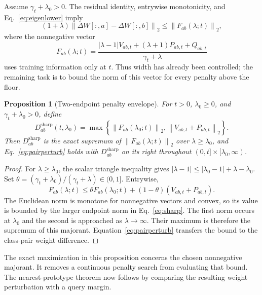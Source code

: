 \documentclass[preprint,12pt]{elsarticle}
\newtheorem{proposition}{Proposition}
\newcommand{\norm}[1]{\left\lVert#1\right\rVert}
\newcommand{\sharpb}{\mathrm{sharp}}
\begin{document}
Assume $\gamma_t+\lambda_0>0$. The residual identity, entrywise monotonicity, and Eq.~\eqref{eq:eigenlower} imply
\begin{equation}
 (1+\lambda)\norm{\Delta W[:,a]-\Delta W[:,b]}_2
 \leq\norm{F_{ab}(\lambda;t)}_2,
 \label{eq:pairperturb}
\end{equation}
where the nonnegative vector
\begin{equation}
 F_{ab}(\lambda;t)=
 \frac{|\lambda-1|V_{ab,t}+(\lambda+1)P_{ab,t}+Q_{ab,t}}
 {\gamma_t+\lambda}
 \label{eq:majorant}
\end{equation}
uses training information only at $t$. Thus width has already been controlled; the remaining task is to bound the norm of this vector for every penalty above the floor.

\begin{proposition}[Two-endpoint penalty envelope]
For $t>0$, $\lambda_0\geq0$, and $\gamma_t+\lambda_0>0$, define
\begin{equation}
 D^{\sharpb}_{ab}(t,\lambda_0)=
 \max\left\{\norm{F_{ab}(\lambda_0;t)}_2,
                  \norm{V_{ab,t}+P_{ab,t}}_2\right\}.
 \label{eq:sharp}
\end{equation}
Then $D^{\sharpb}_{ab}$ is the exact supremum of $\norm{F_{ab}(\lambda;t)}_2$ over $\lambda\geq\lambda_0$, and Eq.~\eqref{eq:pairperturb} holds with $D^{\sharpb}_{ab}$ on its right throughout $(0,t]\times[\lambda_0,\infty)$.
\end{proposition}
\begin{proof}
For $\lambda\geq\lambda_0$, the scalar triangle inequality gives
$|\lambda-1|\leq|\lambda_0-1|+\lambda-\lambda_0$. Set
$\theta=(\gamma_t+\lambda_0)/(\gamma_t+\lambda)\in(0,1]$. Entrywise,
\[
 F_{ab}(\lambda;t)
 \leq\theta F_{ab}(\lambda_0;t)
       +(1-\theta)(V_{ab,t}+P_{ab,t}).
\]
The Euclidean norm is monotone for nonnegative vectors and convex, so its value is bounded by the larger endpoint norm in Eq.~\eqref{eq:sharp}. The first norm occurs at $\lambda_0$ and the second is approached as $\lambda\to\infty$. Their maximum is therefore the supremum of this majorant. Equation~\eqref{eq:pairperturb} transfers the bound to the class-pair weight difference.
\end{proof}

The exact maximization in this proposition concerns the chosen nonnegative majorant. It removes a continuous penalty search from evaluating that bound. The nearest-prototype theorem now follows by comparing the resulting weight perturbation with a query margin.
\end{document}
